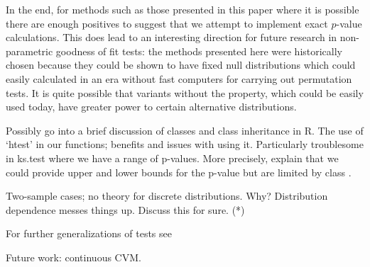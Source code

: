 In the end, for methods such as those presented in this paper where it is possible
there are enough positives to suggest that we attempt to implement exact $p$-value calculations. This does lead
to an interesting direction for future research in non-parametric goodness of fit tests: the methods presented
here were historically chosen because they could be shown to have fixed null distributions which could easily
calculated in an era without fast computers for carrying out permutation tests. It is quite possible that
variants without the property, which could be easily used today, have greater power to certain alternative 
distributions.

Possibly go into a brief discussion of classes and class inheritance in R. The use of `htest' in our functions; benefits and issues with using it. Particularly troublesome in ks.test where we have a range of p-values.  More precisely, explain that we
could provide upper and lower bounds for the p-value but are limited by class
.

Two-sample cases; no theory for discrete distributions. Why? Distribution dependence messes things up. Discuss this for sure. (*)

For further generalizations of tests see \cite{dewev1973}

Future work: continuous CVM.


%



\address{
  Taylor B. Arnold \\
  24 Hillhouse Ave. \\
  New Haven, CT 06511
  USA\\
}

\address{
  John W. Emerson \\
  24 Hillhouse Ave. \\
  New Haven, CT 06511
  USA\\
}

